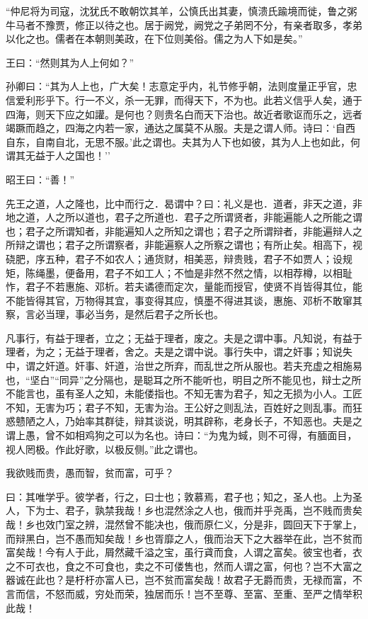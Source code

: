 \documentclass[]{article}
\begin{document}
``仲尼将为司寇，沈犹氏不敢朝饮其羊，公慎氏出其妻，慎溃氏踰境而徙，鲁之粥牛马者不豫贾，修正以待之也。居于阙党，阙党之子弟罔不分，有亲者取多，孝弟以化之也。儒者在本朝则美政，在下位则美俗。儒之为人下如是矣。''

王曰：``然则其为人上何如？''

孙卿曰：``其为人上也，广大矣！志意定乎内，礼节修乎朝，法则度量正乎官，忠信爱利形乎下。行一不义，杀一无罪，而得天下，不为也。此若义信乎人矣，通于四海，则天下应之如讙。是何也？则贵名白而天下治也。故近者歌讴而乐之，远者竭蹶而趋之，四海之内若一家，通达之属莫不从服。夫是之谓人师。诗曰：`自西自东，自南自北，无思不服。'此之谓也。夫其为人下也如彼，其为人上也如此，何谓其无益于人之国也！''

昭王曰：``善！''

先王之道，人之隆也，比中而行之．曷谓中？曰：礼义是也．道者，非天之道，非地之道，人之所以道也，君子之所道也．君子之所谓贤者，非能遍能人之所能之谓也；君子之所谓知者，非能遍知人之所知之谓也；君子之所谓辩者，非能遍辩人之所辩之谓也；君子之所谓察者，非能遍察人之所察之谓也；有所止矣。相高下，视硗肥，序五种，君子不如农人；通货财，相美恶，辩贵贱，君子不如贾人；设规矩，陈绳墨，便备用，君子不如工人；不恤是非然不然之情，以相荐樽，以相耻怍，君子不若惠施、邓析。若夫谲德而定次，量能而授官，使贤不肖皆得其位，能不能皆得其官，万物得其宜，事变得其应，慎墨不得进其谈，惠施、邓析不敢窜其察，言必当理，事必当务，是然后君子之所长也。

凡事行，有益于理者，立之；无益于理者，废之。夫是之谓中事。凡知说，有益于理者，为之；无益于理者，舍之。夫是之谓中说。事行失中，谓之奸事；知说失中，谓之奸道。奸事、奸道，治世之所弃，而乱世之所从服也。若夫充虚之相施易也，``坚白''``同异''之分隔也，是聪耳之所不能听也，明目之所不能见也，辩士之所不能言也，虽有圣人之知，未能偻指也。不知无害为君子，知之无损为小人。工匠不知，无害为巧；君子不知，无害为治。王公好之则乱法，百姓好之则乱事。而狂惑戆陋之人，乃始率其群徒，辩其谈说，明其辟称，老身长子，不知恶也。夫是之谓上愚，曾不如相鸡狗之可以为名也。诗曰：``为鬼为蜮，则不可得，有腼面目，视人罔极。作此好歌，以极反侧。''此之谓也。

我欲贱而贵，愚而智，贫而富，可乎？

曰：其唯学乎。彼学者，行之，曰士也；敦慕焉，君子也；知之，圣人也。上为圣人，下为士、君子，孰禁我哉！乡也混然涂之人也，俄而并乎尧禹，岂不贱而贵矣哉！乡也效门室之辨，混然曾不能决也，俄而原仁义，分是非，圆回天下于掌上，而辩黑白，岂不愚而知矣哉！乡也胥靡之人，俄而治天下之大器举在此，岂不贫而富矣哉！今有人于此，屑然藏千溢之宝，虽行貣而食，人谓之富矣。彼宝也者，衣之不可衣也，食之不可食也，卖之不可偻售也，然而人谓之富，何也？岂不大富之器诚在此也？是杅杅亦富人已，岂不贫而富矣哉！故君子无爵而贵，无禄而富，不言而信，不怒而威，穷处而荣，独居而乐！岂不至尊、至富、至重、至严之情举积此哉！
\end{document}
